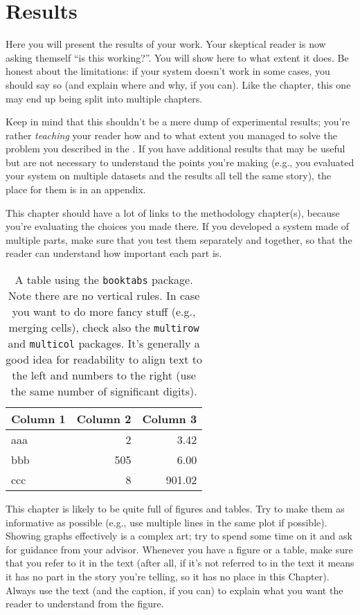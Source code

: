\chapter{Results}
\label{ch:results}

Here you will present the results of your work. Your skeptical reader is now asking themself
``is this working?''. You will show here to what extent it does. Be honest about the limitations: if your system doesn't work in some cases, you should say so (and explain where and why, if you
can). Like the  chapter, this one may end up being split into multiple chapters.

Keep in mind that this shouldn't be a mere dump of experimental results; you're rather
\emph{teaching} your reader how and to what extent you managed to solve the problem you
described in the . If you have additional results that may be useful but are not necessary to understand the points you're making (e.g., you evaluated your system on multiple datasets and the results all tell the same story), the place for them is in an appendix.

This chapter should have a lot of links to the methodology chapter(s), because you're
evaluating the choices you made there. If you developed a system made of multiple parts,
make sure that you test them separately and together, so that the reader can understand how
important each part is.

\begin{table}
    \centering
    \begin{tabular}{lrr}
        \toprule
        \textbf{Column 1} & \textbf{Column 2} & \textbf{Column 3} \\
        \midrule
        aaa &   2 &   3.42 \\
        bbb & 505 &   6.00 \\
        ccc &   8 & 901.02 \\
        \bottomrule
    \end{tabular}
    \caption{A table using the \latex \texttt{booktabs} package. Note there are no vertical
    rules. In case you want to do more fancy stuff (e.g., merging cells), check also the
    \texttt{multirow} and \texttt{multicol} packages. It's generally a good idea for readability
    to align text to the left and numbers to the right (use the same number of significant digits).}
    \label{tab:table}
\end{table}

This chapter is likely to be quite full of figures and tables. Try to make them as informative
as possible (e.g., use multiple lines in the same plot if possible). Showing graphs
effectively is a complex art; try to spend some time on it and ask for guidance from your
advisor. Whenever you have a figure or a table, make sure that you refer to it in the text
(after all, if it's not referred to in the text it means it has no part in the story you're
telling, so it has no place in this Chapter). Always use the text (and the caption, if you can) to explain what you want the reader to understand from the figure.


